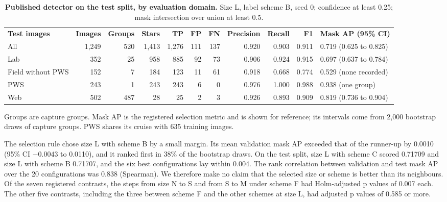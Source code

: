 \begin{table}[!htbp]
\centering
\caption{\textbf{Published detector on the test split, by evaluation domain.} Size L, label scheme B, seed 0; confidence at least 0.25; mask intersection over union at least 0.5.}
\label{tab:detdomains}
{\footnotesize
\setlength{\tabcolsep}{3.5pt}
\begin{tabular}{|l|r|r|r|r|r|r|r|r|r|l|}
\hline
\textbf{Test images} & \textbf{Images} & \textbf{Groups} & \textbf{Stars} & \textbf{TP} & \textbf{FP} & \textbf{FN} & \textbf{Precision} & \textbf{Recall} & \textbf{F1} & \textbf{Mask AP (95\% CI)} \\ \thickhline
All & 1,249 & 520 & 1,413 & 1,276 & 111 & 137 & 0.920 & 0.903 & 0.911 & 0.719 (0.625 to 0.825) \\ \hline
Lab & 352 & 25 & 958 & 885 & 92 & 73 & 0.906 & 0.924 & 0.915 & 0.697 (0.637 to 0.784) \\ \hline
Field without PWS & 152 & 7 & 184 & 123 & 11 & 61 & 0.918 & 0.668 & 0.774 & 0.529 (none recorded) \\ \hline
PWS & 243 & 1 & 243 & 243 & 6 & 0 & 0.976 & 1.000 & 0.988 & 0.938 (one group) \\ \hline
Web & 502 & 487 & 28 & 25 & 2 & 3 & 0.926 & 0.893 & 0.909 & 0.819 (0.736 to 0.904) \\ \hline
\end{tabular}
}
\begin{flushleft}\small
Groups are capture groups.
Mask AP is the registered selection metric and is shown for reference; its intervals come from 2,000 bootstrap draws of capture groups.
PWS shares its cruise with 635 training images.
\end{flushleft}
\end{table}

The selection rule chose size L with scheme B by a small margin.
Its mean validation mask AP exceeded that of the runner-up by 0.0010 (95\% CI $-0.0043$ to 0.0110), and it ranked first in 38\% of the bootstrap draws.
On the test split, size L with scheme C scored 0.71709 and size L with scheme B 0.71707, and the six best configurations lay within 0.004.
The rank correlation between validation and test mask AP over the 20 configurations was 0.838 (Spearman).
We therefore make no claim that the selected size or scheme is better than its neighbours.
Of the seven registered contrasts, the steps from size N to S and from S to M under scheme F had Holm-adjusted p values of 0.007 each.
The other five contrasts, including the three between scheme F and the other schemes at size L, had adjusted p values of 0.585 or more.

